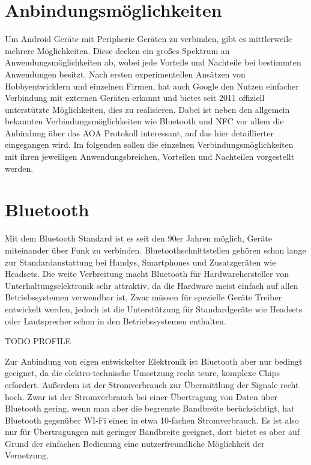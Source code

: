 \documentclass[12pt,journal,compsoc]{IEEEtran}
\begin{document}
\section{Anbindungsmöglichkeiten}
Um Android Geräte mit Peripherie Geräten zu verbinden, gibt es mittlerweile mehrere Möglichkeiten.
Diese decken ein großes Spektrum an Anwendungsmöglichkeiten ab, wobei jede Vorteile und Nachteile bei bestimmten Anwendungen besitzt.
Nach ersten experimentellen Ansätzen von Hobbyentwicklern und einzelnen Firmen, hat auch Google den Nutzen einfacher Verbindung mit externen Geräten 
erkannt und bietet seit 2011 offiziell unterstützte Möglichkeiten, dies zu realisieren.
Dabei ist neben den allgemein bekannten Verbindungsmöglichkeiten wie Bluetooth und NFC vor allem die Anbindung über das AOA Protokoll interessant, auf das hier detaillierter eingegangen wird.
Im folgenden sollen die einzelnen Verbindungsmöglichkeiten mit ihren jeweiligen Anwendungsbreichen, Vorteilen und Nachteilen vorgestellt werden.

\section{Bluetooth}
Mit dem Bluetooth Standard ist es seit den 90er Jahren möglich, Geräte miteinander über Funk zu verbinden. Bluetoothschnittstellen gehören schon lange zur Standardaustattung bei Handys, Smartphones und Zusatzgeräten wie Headsets.
Die weite Verbreitung macht Bluetooth für Hardwarehersteller von Unterhaltungselektronik sehr attraktiv, da die Hardware meist einfach auf allen Betriebssystemen verwendbar ist.
Zwar müssen für spezielle Geräte Treiber entwickelt werden, jedoch ist die Unterstützung für Standardgeräte wie Headsets oder Lautsprecher schon in den Betriebssystemen enthalten.

TODO PROFILE
\cite{bluetooth}

Zur Anbindung von eigen entwickelter Elektronik ist Bluetooth aber nur bedingt geeignet, da die elektro-technische Umsetzung recht teure, komplexe Chips erfordert. Außerdem ist der Stromverbrauch zur Übermittlung der Signale recht hoch.
Zwar ist der Stromverbrauch bei einer Übertragung von Daten über Bluetooth gering, wenn man aber die begrenzte Bandbreite berücksichtigt, hat Bluetooth gegenüber WI-Fi einen in etwa 10-fachen Stromverbrauch.\cite{wireless}
Es ist also nur für Übertragungen mit geringer Bandbreite geeignet, dort bietet es aber auf Grund der einfachen Bedienung eine nutzerfreundliche Möglichkeit der Vernetzung.
\end{document}
